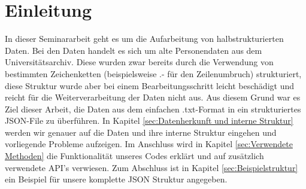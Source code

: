 \section{Einleitung}
 \label{sec:Einleitung}

In dieser Seminararbeit geht es um die Aufarbeitung von halbstrukturierten Daten. Bei den Daten handelt es sich um alte Personendaten aus dem Universitätsarchiv. Diese wurden zwar bereits durch die Verwendung von bestimmten Zeichenketten (beispielsweise .- für den Zeilenumbruch) strukturiert, diese Struktur wurde aber bei einem Bearbeitungsschritt leicht beschädigt und reicht für die Weiterverarbeitung der Daten nicht aus. Aus diesem Grund war es Ziel dieser Arbeit, die Daten aus dem einfachen .txt-Format in ein strukturiertes JSON-File zu überführen. In Kapitel \ref{sec:Datenherkunft und interne Struktur} werden wir genauer auf die Daten und ihre interne Struktur eingehen und vorliegende Probleme aufzeigen. Im Anschluss wird in Kapitel \ref{sec:Verwendete Methoden} die Funktionalität unseres Codes erklärt und auf zusätzlich verwendete API's verwiesen. Zum Abschluss ist in Kapitel \ref{sec:Beispielstruktur} ein Beispiel für unsere komplette JSON Struktur angegeben.
